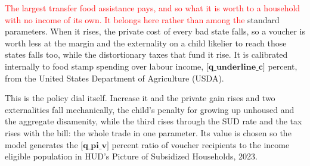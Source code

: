 \documentclass[10pt]{article}
\begin{document}
\begin{description}
\textcolor{red}{The largest transfer food assistance pays, and so what it is worth to a household with no}
\textcolor{red}{income of its own. It belongs here rather than among the}
standard parameters. When it rises, the private cost of every bad
state falls, so a voucher is worth less at the margin and the externality on a
child likelier to reach those states falls too, while the distortionary
taxes that fund it rise.
It is calibrated internally to food stamp spending over labour income,
$\textbf{[q_underline_c]}$ percent, from the United States Department of Agriculture (USDA).
\item[$\pi_V$, the chance of drawing a voucher.] This is the policy dial itself.
 Increase it and the private gain rises and two externalities fall
mechanically, the child's penalty for growing up unhoused and the aggregate
disamenity, while the third rises through the SUD rate and the tax rises with the
bill: the whole trade in one parameter. Its value is chosen so the model generates
the $\textbf{[q_pi_v]}$ percent ratio of voucher recipients to the income eligible population in
HUD's Picture of Subsidized Households, 2023.
\end{description}
\end{document}
